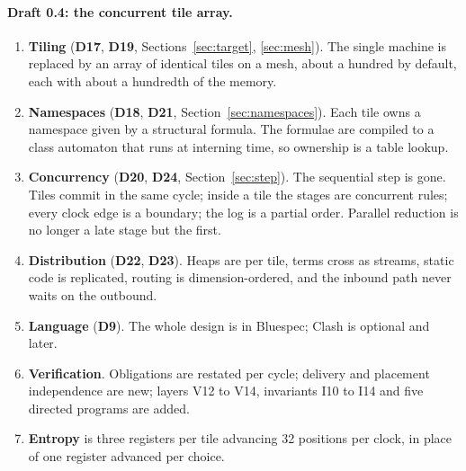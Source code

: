 \documentclass[10.5pt,a4paper]{extarticle}
\newcommand{\dec}[1]{\textbf{D#1}}
\theoremstyle{definition}
\theoremstyle{remark}
\begin{document}
\paragraph{Draft 0.4: the concurrent tile array.}
\begin{enumerate}
\item \textbf{Tiling} (\dec{17}, \dec{19}, Sections~\ref{sec:target},
\ref{sec:mesh}). The single machine is replaced by an array of identical
tiles on a mesh, about a hundred by default, each with about a hundredth of
the memory.
\item \textbf{Namespaces} (\dec{18}, \dec{21},
Section~\ref{sec:namespaces}). Each tile owns a namespace given by a
structural formula. The formulae are compiled to a class automaton that runs
at interning time, so ownership is a table lookup.
\item \textbf{Concurrency} (\dec{20}, \dec{24}, Section~\ref{sec:step}). The
sequential step is gone. Tiles commit in the same cycle; inside a tile the
stages are concurrent rules; every clock edge is a boundary; the log is a
partial order. Parallel reduction is no longer a late stage but the first.
\item \textbf{Distribution} (\dec{22}, \dec{23}). Heaps are per tile, terms
cross as streams, static code is replicated, routing is dimension-ordered,
and the inbound path never waits on the outbound.
\item \textbf{Language} (\dec{9}). The whole design is in Bluespec; Clash is
optional and later.
\item \textbf{Verification}. Obligations are restated per cycle; delivery and
placement independence are new; layers V12 to V14, invariants I10 to I14 and
five directed programs are added.
\item \textbf{Entropy} is three registers per tile advancing 32 positions per
clock, in place of one register advanced per choice.
\end{enumerate}
\end{document}

